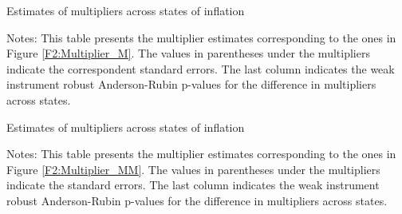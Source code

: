 \documentclass[12pt]{article}
\newcommand{\annote}[1]{\parbox{\textwidth}{\renewcommand{\baselinestretch}{1.0}\vspace{12pt} \footnotesize Notes: #1}}
\begin{document}
\begin{appendices}
\begin{table}[ht]
\centering
\def\sym#1{\ifmmode^{#1}\else\(^{#1}\)\fi}
\caption{Estimates of multipliers across states of inflation \label{T:SDPM}}

\annote{\footnotesize This table presents the multiplier estimates corresponding to the ones in Figure \ref{F2:Multiplier_M}. The values in parentheses under the multipliers indicate the correspondent standard errors. The last column indicates the weak instrument robust Anderson-Rubin p-values for the difference in multipliers across states.}
\end{table}


\begin{table}[ht]
\centering
\def\sym#1{\ifmmode^{#1}\else\(^{#1}\)\fi}
\caption{Estimates of multipliers across states of inflation \label{T:SDPM_App}}

\annote{\footnotesize This table presents the multiplier estimates corresponding to the ones in Figure \ref{F2:Multiplier_MM}. The values in parentheses under the multipliers indicate the standard errors. The last column indicates the weak instrument robust Anderson-Rubin p-values for the difference in multipliers across states.}
\end{table}

\clearpage

%	


\end{appendices}
\end{document}
